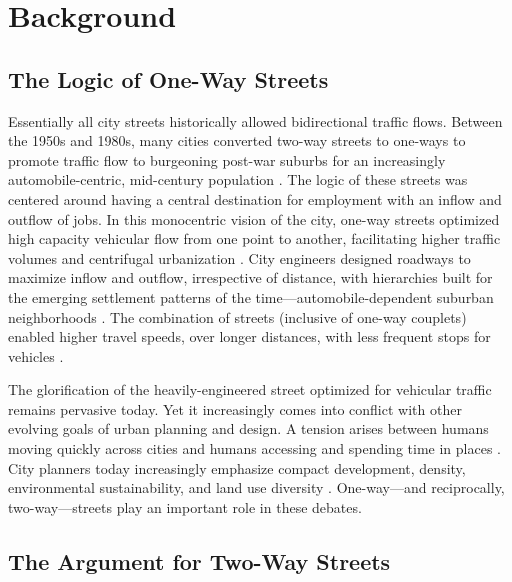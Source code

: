 \documentclass{article}
\begin{document}
\section{Background}

\subsection{The Logic of One-Way Streets}

Essentially all city streets historically allowed bidirectional traffic flows. Between the 1950s and 1980s, many cities converted two-way streets to one-ways to promote traffic flow to burgeoning post-war suburbs for an increasingly automobile-centric, mid-century population \citep{appleyard_livable_1980,hall_cities_1996,handy_planning_2003,jackson_crabgrass_1987}. The logic of these streets was centered around having a central destination for employment with an inflow and outflow of jobs. In this monocentric vision of the city, one-way streets optimized high capacity vehicular flow from one point to another, facilitating higher traffic volumes and centrifugal urbanization \citep{dover_street_2013}. City engineers designed roadways to maximize inflow and outflow, irrespective of distance, with hierarchies built for the emerging settlement patterns of the time---automobile-dependent suburban neighborhoods \citep{buchanan_traffic_1963,bavarez_traffic_1967}. The combination of streets (inclusive of one-way couplets) enabled higher travel speeds, over longer distances, with less frequent stops for vehicles \citep{hebbert_engineering_2005}.

The glorification of the heavily-engineered street optimized for vehicular traffic remains pervasive today. Yet it increasingly comes into conflict with other evolving goals of urban planning and design. A tension arises between humans moving quickly across cities and humans accessing and spending time in places \citep{hebbert_engineering_2005}. City planners today increasingly emphasize compact development, density, environmental sustainability, and land use diversity \citep{stevens_does_2017,salon_how_2012}. One-way---and reciprocally, two-way---streets play an important role in these debates.

\subsection{The Argument for Two-Way Streets}
\end{document}
